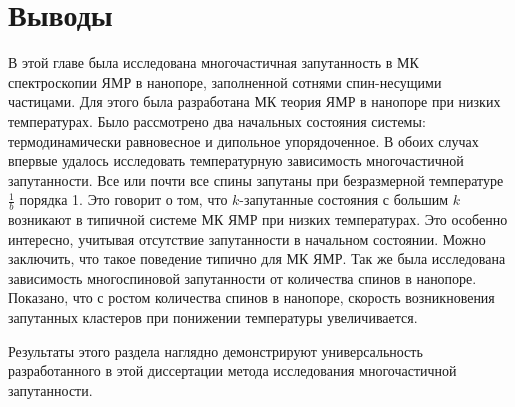 \section{Выводы}
\label{sec:conslusions}

В этой главе была исследована многочастичная запутанность в МК спектроскопии ЯМР в нанопоре, заполненной сотнями спин-несущими частицами.
Для этого была разработана МК теория ЯМР в нанопоре при низких температурах.
Было рассмотрено два начальных состояния системы:
термодинамически равновесное
и дипольное упорядоченное.
В обоих случах впервые удалось исследовать температурную зависимость многочастичной запутанности.
Все или почти все спины запутаны при безразмерной температуре $\frac{1}{b}$ порядка 1.
Это говорит о том, что $k$-запутанные состояния с большим $k$ возникают в типичной системе МК ЯМР при низких температурах.
Это особенно интересно, учитывая отсутствие запутанности в начальном состоянии.
Можно заключить, что такое поведение типично для МК ЯМР.
Так же была исследована зависимость многоспиновой запутанности
от количества спинов в нанопоре.
Показано, что с ростом количества спинов в нанопоре,
скорость возникновения запутанных кластеров при понижении температуры увеличивается.

Результаты этого раздела наглядно демонстрируют
универсальность разработанного в этой диссертации метода исследования многочастичной запутанности.